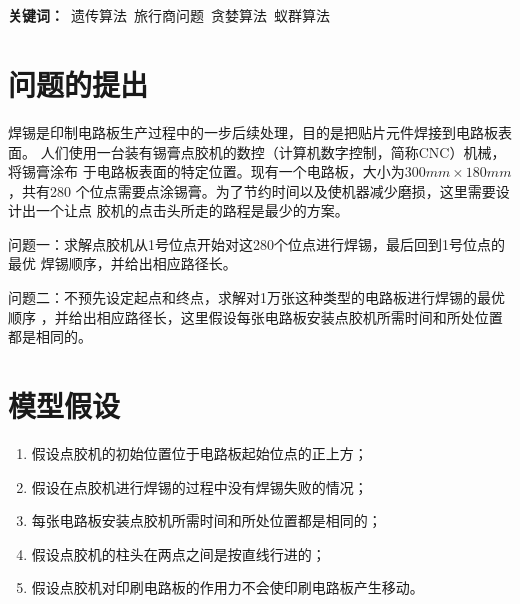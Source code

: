 \documentclass[fontset=windows,a4paper,12pt]{ctexart}
\begin{document}
  \\
  \\
  \textbf{关键词：}\ 遗传算法\ 旅行商问题\ 贪婪算法\ 蚁群算法

  \newpage
  \section{问题的提出}
    焊锡是印制电路板生产过程中的一步后续处理，目的是把贴片元件焊接到电路板表面。
    人们使用一台装有锡膏点胶机的数控（计算机数字控制，简称CNC）机械，将锡膏涂布
    于电路板表面的特定位置。现有一个电路板，大小为$300mm\times180mm$，共有280
    个位点需要点涂锡膏。为了节约时间以及使机器减少磨损，这里需要设计出一个让点
    胶机的点击头所走的路程是最少的方案。

    问题一：求解点胶机从1号位点开始对这280个位点进行焊锡，最后回到1号位点的最优
    焊锡顺序，并给出相应路径长。

    问题二：不预先设定起点和终点，求解对1万张这种类型的电路板进行焊锡的最优顺序
    ，并给出相应路径长，这里假设每张电路板安装点胶机所需时间和所处位置都是相同的。

  \section{模型假设}
    \begin{enumerate}
      \item 假设点胶机的初始位置位于电路板起始位点的正上方；
      \item 假设在点胶机进行焊锡的过程中没有焊锡失败的情况；
      \item 每张电路板安装点胶机所需时间和所处位置都是相同的；
      \item 假设点胶机的柱头在两点之间是按直线行进的；
      \item 假设点胶机对印刷电路板的作用力不会使印刷电路板产生移动。
    \end{enumerate}
    
\end{document}
